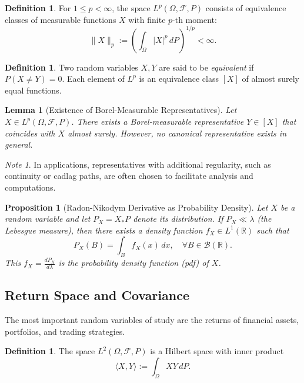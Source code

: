 \documentclass[11pt,reqno]{amsart}
\newtheorem{lemma}[theorem]{Lemma}
\newtheorem{proposition}[theorem]{Proposition}
\theoremstyle{definition}
\newtheorem{definition}[theorem]{Definition}
\theoremstyle{remark}
\newtheorem*{note}{Note}
\begin{document}
\begin{definition}
	For $1 \leq p < \infty$, the space $L^p(\Omega, \mathcal{F}, P)$ consists of equivalence classes of measurable functions $X$ with finite $p$-th moment:
	\[
		\|X\|_p := \left( \int_\Omega |X|^p \, dP \right)^{1/p} < \infty.
	\]
\end{definition}

\begin{definition}
	Two random variables $X, Y$ are said to be \emph{equivalent} if $P(X \neq Y)=0$. Each element of $L^p$ is an equivalence class $[X]$ of almost surely equal functions.
\end{definition}

\begin{lemma}[Existence of Borel-Measurable Representatives]
	Let $X \in L^p(\Omega, \mathcal{F}, P)$. There exists a Borel-measurable representative $Y \in [X]$ that coincides with $X$ almost surely. However, no canonical representative exists in general.
\end{lemma}

\begin{note}
	In applications, representatives with additional regularity, such as continuity or cadlag paths, are often chosen to facilitate analysis and computations.
\end{note}

\begin{proposition}[Radon-Nikodym Derivative as Probability Density]
	Let $X$ be a random variable and let $P_X = X_*P$ denote its distribution. If $P_X \ll \lambda$ (the Lebesgue measure), then there exists a density function $f_X \in L^1(\mathbb{R})$ such that
	\[
		P_X(B) = \int_B f_X(x) \, dx, \quad \forall B \in \mathcal{B}(\mathbb{R}).
	\]
	This $f_X = \frac{dP_X}{d\lambda}$ is the \emph{probability density function} (pdf) of $X$.
\end{proposition}

\subsection{Return Space and Covariance}

The most important random variables of study are the returns of financial assets, portfolios, and trading strategies.

\begin{definition}
	The space $L^2(\Omega, \mathcal{F}, P)$ is a Hilbert space with inner product
	\[
		\langle X, Y \rangle := \int_\Omega X Y \, dP.
	\]
\end{definition}
\end{document}
